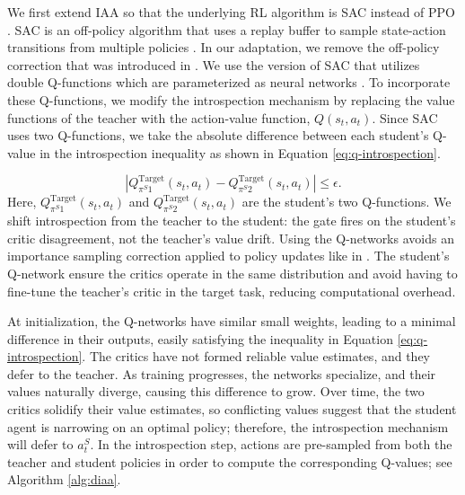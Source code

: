 \documentclass{article} %
\begin{document}
We first extend IAA so that the underlying RL algorithm is SAC instead of PPO \citep{campbell2023introspective}. SAC is an off-policy algorithm that uses a replay buffer to sample state-action transitions from multiple policies \citep{haarnoja_soft_2018}. In our adaptation, we remove the off-policy correction that was introduced in \citet{campbell2023introspective}. We use the version of SAC that utilizes double Q-functions which are parameterized as neural networks \citep{fujimoto2018addressing}. To incorporate these Q-functions, we modify the introspection mechanism by replacing the value functions of the teacher with the action-value function, $Q(s_t, a_t)$. Since SAC uses two Q-functions, we take the absolute difference between each student's Q-value in the introspection inequality as shown in Equation \ref{eq:q-introspection}. 

\begin{equation}
\label{eq:q-introspection}
|Q_{\pi^S 1}^{\text{Target}}(s_t,a_t)- Q_{\pi^S 2}^{\text{Target}}(s_t,a_t)| \leq \epsilon.
\end{equation} 
Here, $Q_{\pi^S 1}^{\text{Target}}(s_t,a_t)$ and $Q_{\pi^S 2}^{\text{Target}}(s_t,a_t)$ are the student's two Q-functions. We shift introspection from the teacher to the student: the gate fires on the student's critic disagreement, not the teacher's value drift. Using the Q-networks avoids an importance sampling correction applied to policy updates like in \cite{campbell2023introspective}. The student's Q-network ensure the critics operate in the same distribution and avoid having to fine-tune the teacher's critic in the target task, reducing computational overhead.

At initialization, the Q-networks have similar small weights, leading to a minimal difference in their outputs, easily satisfying the inequality in Equation \ref{eq:q-introspection}. The critics have not formed reliable value estimates, and they defer to the teacher. As training progresses, the networks specialize, and their values naturally diverge, causing this difference to grow. Over time, the two critics solidify their value estimates, so conflicting values suggest that the student agent is narrowing on an optimal policy; therefore, the introspection mechanism will defer to $a_t^S$. In the introspection step, actions are pre-sampled from both the teacher and student policies in order to compute the corresponding Q-values; see Algorithm \ref{alg:diaa}. 
\end{document}
